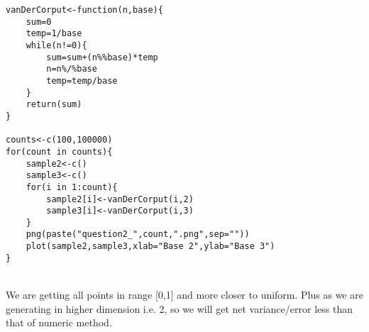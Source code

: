 \documentclass[11pt]{article}
\begin{document}
\begin{lstlisting}
vanDerCorput<-function(n,base){
	sum=0
	temp=1/base
	while(n!=0){
		sum=sum+(n%%base)*temp
		n=n%/%base
		temp=temp/base
	}
	return(sum)
}

counts<-c(100,100000)
for(count in counts){
	sample2<-c()
	sample3<-c()
	for(i in 1:count){
		sample2[i]<-vanDerCorput(i,2)
		sample3[i]<-vanDerCorput(i,3)
	}
	png(paste("question2_",count,".png",sep=""))
	plot(sample2,sample3,xlab="Base 2",ylab="Base 3")
}

\end{lstlisting}
\\
We are getting all points in range [0,1] and more closer to uniform. Plus as we are generating in higher dimension 
i.e. 2, so we will get net variance/error less than that of numeric method.
\newpage 
\begin{description}
\textbf{Graph: }\
\begin{figure}[H]
\item For 100000 values\\
\centering
{}}
\end{figure}
\begin{figure}[H]
\item For 100 values\\
\centering
\subfloat[X1]{\texttt{[image: \{question2\_100]}.png}}
\end{figure}
\end{description}
\end{document}
